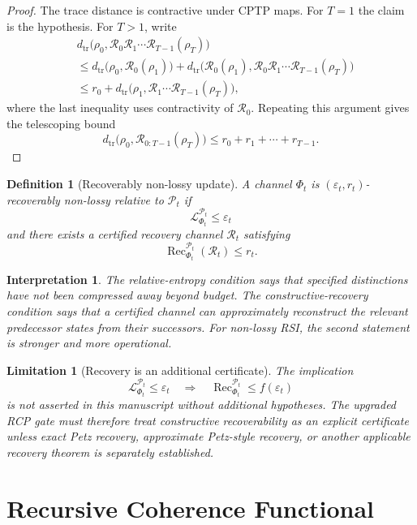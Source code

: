 \documentclass[11pt]{article}
\newtheorem{definition}[theorem]{Definition}
\newtheorem{interpretation}[theorem]{Interpretation}
\newtheorem{limitation}[theorem]{Limitation}
\newcommand{\Pcal}{\mathcal{P}}
\newcommand{\Rcal}{\mathcal{R}}
\newcommand{\Lcal}{\mathcal{L}}
\newcommand{\1}{\mathbf{1}}
\newcommand{\eps}{\varepsilon}
\providecommand{\Rec}{\operatorname{Rec}}
\begin{document}
\begin{proof}
The trace distance is contractive under CPTP maps.  For \(T=1\) the claim is the hypothesis.  For \(T>1\), write
\[
\begin{aligned}
&d_{\mathrm{tr}}\bigl(\rho_0,
\Rcal_0\Rcal_1\cdots\Rcal_{T-1}(\rho_T)\bigr)\\
&\le
 d_{\mathrm{tr}}\bigl(\rho_0,\Rcal_0(\rho_1)\bigr)
 +
 d_{\mathrm{tr}}\bigl(\Rcal_0(\rho_1),
 \Rcal_0\Rcal_1\cdots\Rcal_{T-1}(\rho_T)\bigr)\\
&\le
r_0+
 d_{\mathrm{tr}}\bigl(\rho_1,
 \Rcal_1\cdots\Rcal_{T-1}(\rho_T)\bigr),
\end{aligned}
\]
where the last inequality uses contractivity of \(\Rcal_0\).  Repeating this argument gives the telescoping bound
\[
d_{\mathrm{tr}}\bigl(\rho_0,
\Rcal_{0:T-1}(\rho_T)\bigr)
\le
r_0+r_1+\cdots+r_{T-1}.
\]
\end{proof}

\begin{definition}[Recoverably non-lossy update]
A channel \(\Phi_t\) is \((\eps_t,r_t)\)-recoverably non-lossy relative to \(\Pcal_t\) if
\[
\Lcal^{\Pcal_t}_{\Phi_t}\le\eps_t
\]
and there exists a certified recovery channel \(\Rcal_t\) satisfying
\[
\Rec^{\Pcal_t}_{\Phi_t}(\Rcal_t)\le r_t.
\]
\end{definition}

\begin{interpretation}
The relative-entropy condition says that specified distinctions have not been compressed away beyond budget.  The constructive-recovery condition says that a certified channel can approximately reconstruct the relevant predecessor states from their successors.  For non-lossy RSI, the second statement is stronger and more operational.
\end{interpretation}

\begin{limitation}[Recovery is an additional certificate]
The implication
\[
\Lcal^{\Pcal_t}_{\Phi_t}\le\eps_t
\quad\Longrightarrow\quad
\Rec^{\Pcal_t}_{\Phi_t}\le f(\eps_t)
\]
is not asserted in this manuscript without additional hypotheses.  The upgraded RCP gate must therefore treat constructive recoverability as an explicit certificate unless exact Petz recovery, approximate Petz-style recovery, or another applicable recovery theorem is separately established.
\end{limitation}

\section{Recursive Coherence Functional}
\end{document}
